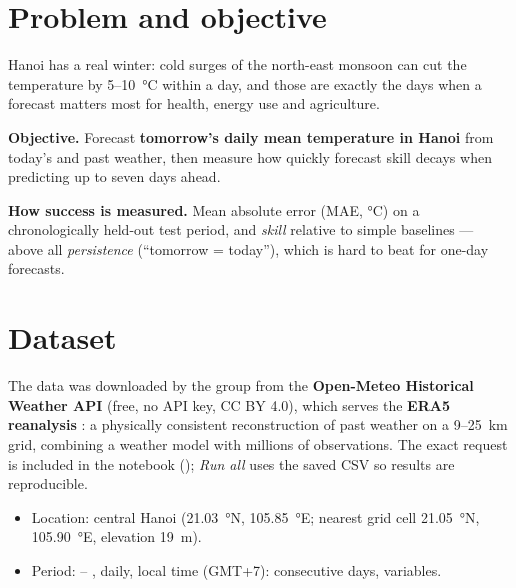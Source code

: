 
\section{Problem and objective}\label{ts:problem}
Hanoi has a real winter: cold surges of the north-east monsoon can cut the temperature by 5–10~°C within a day, and those
are exactly the days when a forecast matters most for health, energy use and agriculture.

\textbf{Objective.} Forecast \textbf{tomorrow's daily mean temperature in Hanoi} from today's and past weather, then measure
how quickly forecast skill decays when predicting up to seven days ahead.

\textbf{How success is measured.} Mean absolute error (MAE, °C) on a chronologically held-out test period, and \emph{skill}
relative to simple baselines — above all \emph{persistence} (``tomorrow = today''), which is hard to beat for one-day forecasts.

\section{Dataset}\label{ts:dataset}
The data was downloaded by the group from the \textbf{Open-Meteo Historical Weather API} \cite{ts-openmeteo} (free, no API
key, CC BY 4.0), which serves the \textbf{ERA5 reanalysis} \cite{ts-era5}: a physically consistent reconstruction of past
weather on a 9–25~km grid, combining a weather model with millions of observations. The exact request is included in the
notebook (); \emph{Run all} uses the saved CSV so results are reproducible.

\begin{itemize}
\item Location: central Hanoi (21.03~°N, 105.85~°E; nearest grid cell 21.05~°N, 105.90~°E, elevation 19~m).
\item Period: \TSStart{} – \TSEnd{}, daily, local time (GMT+7): \TSDays{} consecutive days, \TSVars{} variables.
\end{itemize}

